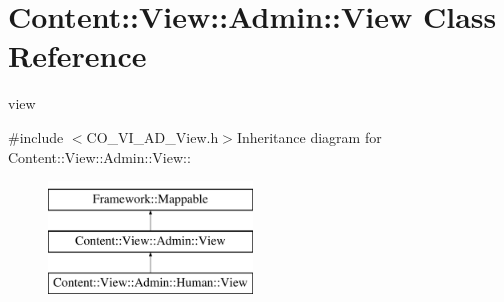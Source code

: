 \hypertarget{classContent_1_1View_1_1Admin_1_1View}{
\section{Content::View::Admin::View Class Reference}
\label{classContent_1_1View_1_1Admin_1_1View}
}


view  


{\ttfamily \#include $<$CO\_\-VI\_\-AD\_\-View.h$>$}Inheritance diagram for Content::View::Admin::View::\begin{figure}[H]
\begin{center}
\leavevmode
\includegraphics[height=3cm]{classContent_1_1View_1_1Admin_1_1View}
\end{center}
\end{figure}
